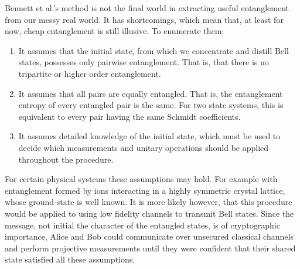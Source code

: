 Bennett et al.'s method is not the final world in extracting useful entanglement from our messy real world.
It has shortcomings, which mean that, at least for now, cheap entanglement is still illusive. To enumerate them:
\begin{enumerate}
	\item It assumes that the initial state, from which we concentrate and distill Bell states, possesses only pairwise entanglement. That is, that there is no tripartite or higher order entanglement.
	\item It assumes that all pairs are equally entangled. That is, the entanglement entropy of every entangled pair is the same. For two state systems, this is equivalent to every pair having the same Schmidt coefficients.
	\item It assumes detailed knowledge of the initial state, which must be used to decide which measurements and unitary operations should be applied throughout the procedure. 
\end{enumerate}

For certain physical systems these assumptions may hold. 
For example with entanglement formed by ions interacting in a highly symmetric crystal lattice, whose ground-state is well known.
It is more likely however, that this procedure would be applied to using low fidelity channels to transmit Bell states.
Since the message, not initial the character of the entangled states, is of cryptographic importance, Alice and Bob could communicate over unsecured classical channels and perform projective measurements until they were confident that their shared state satisfied all these assumptions.
